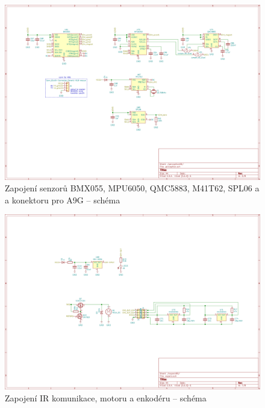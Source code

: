 \begin{figure}
    \centering
    \includegraphics[width=0.93\textheight, angle=90]{kapitoly/ctvrta_elektronicka_varianta/E4_zapojeni/senzorika.png}
    \caption{Zapojení senzorů BMX055, MPU6050, QMC5883, M41T62, SPL06 a a konektoru pro A9G -- schéma \centering}
    \label{fig:E4-sch_senzorika}
\end{figure}
\begin{figure}
    \centering
    \includegraphics[width=0.93\textheight, angle=90]{kapitoly/ctvrta_elektronicka_varianta/E4_zapojeni/IR_motor_enkoder.png}
    \caption{Zapojení IR komunikace, motoru a enkodéru -- schéma}
    \label{fig:E4-sch_IR-Motor-enkoder}
\end{figure}
